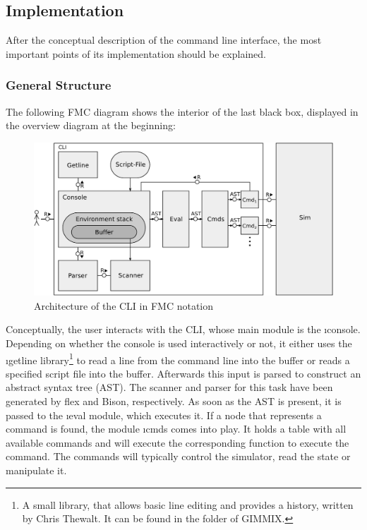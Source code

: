\subsection{Implementation}

After the conceptual description of the command line interface, the most important points of its implementation should be explained.

\subsubsection{General Structure}

The following \gls{FMC} diagram shows the interior of the last black box, displayed in the overview diagram at the beginning:
\begin{figure}[H]
	\centering
	\includegraphics[width=\textwidth]{img/cli-fmc-crop.pdf}
	\caption{Architecture of the CLI in \protect\gls{FMC} notation}
\end{figure}
\noindent Conceptually, the user interacts with the CLI, whose main module is the \i{console}. Depending on whether the console is used interactively or not, it either uses the \i{getline} library\footnote{A small library, that allows basic line editing and provides a history, written by Chris Thewalt. It can be found in the folder  of GIMMIX.}  to read a line from the command line into the buffer or reads a specified script file into the buffer. Afterwards this input is parsed to construct an abstract syntax tree (\gls{AST}). The scanner and parser for this task have been generated by \gls{flex} and \gls{Bison}, respectively. As soon as the \gls{AST} is present, it is passed to the \i{eval} module, which executes it. If a node that represents a command is found, the module \i{cmds} comes into play. It holds a table with all available commands and will execute the corresponding function to execute the command. The commands will typically control the simulator, read the state or manipulate it.


